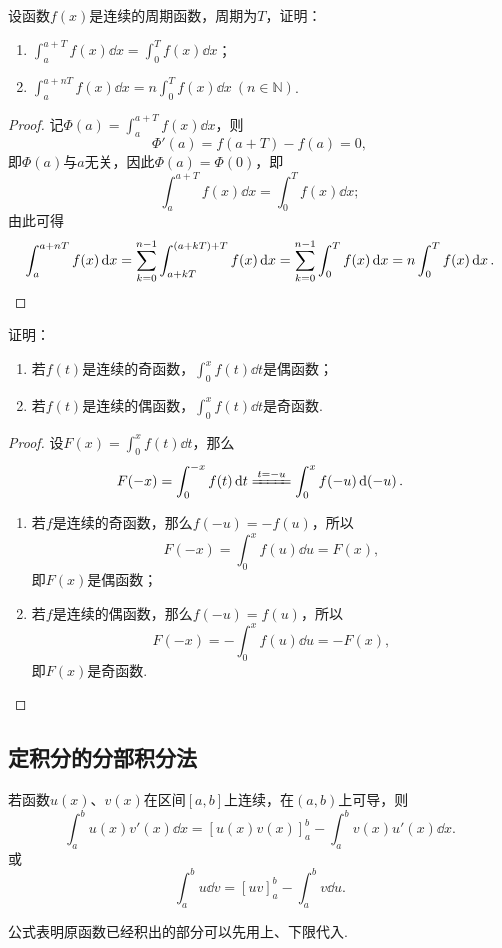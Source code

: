 \begin{example}
设函数\(f(x)\)是连续的周期函数，周期为\(T\)，证明：\begin{enumerate}
\item \(\int_a^{a+T} f(x) \dd{x} = \int_0^T f(x) \dd{x}\)；
\item \(\int_a^{a+nT} f(x)\dd{x} = n\int_0^T f(x)\dd{x}\ (n \in \mathbb{N})\).
\end{enumerate}
\begin{proof}
记\(\Phi(a) = \int_a^{a+T} f(x) \dd{x}\)，则\[
\Phi'(a) = f(a+T) - f(a) = 0,
\]即\(\Phi(a)\)与\(a\)无关，因此\(\Phi(a) = \Phi(0)\)，即\[
\int_a^{a+T} f(x) \dd{x} = \int_0^T f(x) \dd{x};
\]由此可得\[
\int_a^{a+nT} f(x)\dd{x}
= \sum\limits_{k=0}^{n-1} \int_{a+kT}^{(a+kT)+T} f(x) \dd{x}
= \sum\limits_{k=0}^{n-1} \int_0^T f(x) \dd{x}
= n \int_0^T f(x) \dd{x}.
\qedhere
\]
\end{proof}
\end{example}

\begin{example}
证明：\begin{enumerate}
\item 若\(f(t)\)是连续的奇函数，\(\int_0^x f(t) \dd{t}\)是偶函数；
\item 若\(f(t)\)是连续的偶函数，\(\int_0^x f(t) \dd{t}\)是奇函数.
\end{enumerate}
\begin{proof}
设\(F(x) = \int_0^x f(t) \dd{t}\)，那么\[
F(-x) = \int_0^{-x} f(t) \dd{t}
\xlongequal{t=-u} \int_0^x f(-u) \dd(-u).
\]
\begin{enumerate}
\item 若\(f\)是连续的奇函数，那么\(f(-u) = -f(u)\)，所以\[
F(-x) = \int_0^x f(u) \dd{u} = F(x),
\]即\(F(x)\)是偶函数；

\item 若\(f\)是连续的偶函数，那么\(f(-u) = f(u)\)，所以\[
F(-x) = -\int_0^x f(u) \dd{u} = -F(x),
\]即\(F(x)\)是奇函数.
\qedhere
\end{enumerate}
\end{proof}
\end{example}

\subsection{定积分的分部积分法}
\begin{theorem}
若函数\(u(x)\)、\(v(x)\)在区间\([a,b]\)上连续，在\((a,b)\)上可导，则\[
\int_a^b u(x) v'(x) \dd{x} = [u(x) v(x)]_a^b - \int_a^b v(x) u'(x) \dd{x}.
\]或\[
\int_a^b u \dd{v} = [uv]_a^b - \int_a^b v \dd{u}.
\]
\end{theorem}
公式表明原函数已经积出的部分可以先用上、下限代入.

